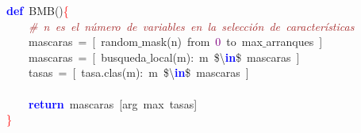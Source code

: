 \noindent
\mbox{}\textbf{\textcolor{Blue}{def}}\ BMB\textcolor{BrickRed}{()}\textcolor{Red}{\{} \\
\mbox{}\ \ \ \ \textit{\textcolor{Brown}{\#\ n\ es\ el\ número\ de\ variables\ en\ la\ selección\ de\ características}} \\
\mbox{}\ \ \ \ mascaras\ \textcolor{BrickRed}{=}\ \textcolor{BrickRed}{[}\ random$\_$mask\textcolor{BrickRed}{(}n\textcolor{BrickRed}{)}\ from\ \textcolor{Purple}{0}\ to\ max$\_$arranques\ \textcolor{BrickRed}{]} \\
\mbox{}\ \ \ \ mascaras\ \textcolor{BrickRed}{=}\ \textcolor{BrickRed}{[}\ busqueda$\_$local\textcolor{BrickRed}{(}m\textcolor{BrickRed}{):}\ m\ \$\textcolor{BrickRed}{\textbackslash{}}\textbf{\textcolor{Blue}{in}}\$\ mascaras\ \textcolor{BrickRed}{]} \\
\mbox{}\ \ \ \ tasas\ \textcolor{BrickRed}{=}\ \textcolor{BrickRed}{[}\ tasa\textcolor{BrickRed}{.}clas\textcolor{BrickRed}{(}m\textcolor{BrickRed}{):}\ m\ \$\textcolor{BrickRed}{\textbackslash{}}\textbf{\textcolor{Blue}{in}}\$\ mascaras\ \textcolor{BrickRed}{]} \\
\mbox{} \\
\mbox{}\ \ \ \ \textbf{\textcolor{Blue}{return}}\ mascaras\ \textcolor{BrickRed}{[}arg\ max\ tasas\textcolor{BrickRed}{]} \\
\mbox{}\textcolor{Red}{\}} \\
\mbox{}
